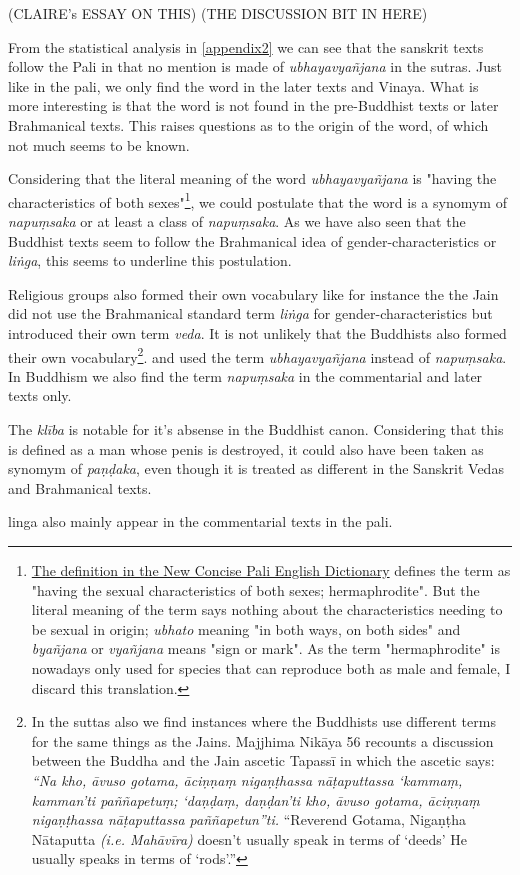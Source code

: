 (CLAIRE's ESSAY ON THIS)
(THE DISCUSSION BIT IN HERE)


From the statistical analysis in \ref{appendix2} we can see that the sanskrit texts follow the Pali in that no mention is made of {\em ubhayavyañjana} in the sutras. Just like in the pali, we only find the word in the later texts and Vinaya. What is more interesting is that the word is not found in the pre-Buddhist texts or later Brahmanical texts. This raises questions as to the origin of the word, of which not much seems to be known.

Considering that the literal meaning of the word {\em ubhayavyañjana} is "having the characteristics of both sexes"\footnote{\href{https://suttacentral.net/define/ubhatovya%C3%B1janaka}{The definition in the New Concise Pali English Dictionary} defines the term as "having the sexual characteristics of both sexes; hermaphrodite". But the literal meaning of the term says nothing about the characteristics needing to be sexual in origin; {\em ubhato} meaning "in both ways, on both sides" and {\em byañjana} or {\em vyañjana} means "sign or mark". As the term "hermaphrodite" is nowadays only used for species that can reproduce both as male and female, I discard this translation.}, we could postulate that the word is a synomym of {\em napuṃsaka} or at least a class of {\em napuṃsaka}. As we have also seen that the Buddhist texts seem to follow the Brahmanical idea of gender-characteristics or {\em liṅga}, this seems to underline this postulation.

Religious groups also formed their own vocabulary like for instance the the Jain did not use the Brahmanical standard term {\em liṅga} for gender-characteristics but introduced their own term {\em veda}. It is not unlikely that the Buddhists also formed their own vocabulary\footnote{In the suttas also we find instances where the Buddhists use different terms for the same things as the Jains. Majjhima Nikāya 56 recounts a discussion between the Buddha and the Jain ascetic Tapassī in which the ascetic says: {\em “Na kho, āvuso gotama, āciṇṇaṃ nigaṇṭhassa nāṭaputtassa ‘kammaṃ, kamman’ti paññapetuṃ; ‘daṇḍaṃ, daṇḍan’ti kho, āvuso gotama, āciṇṇaṃ nigaṇṭhassa nāṭaputtassa paññapetun”ti.} “Reverend Gotama, Nigaṇṭha Nātaputta {\em (i.e. Mahāvīra)} doesn’t usually speak in terms of ‘deeds’ He usually speaks in terms of ‘rods’.” }. and used the term {\em ubhayavyañjana} instead of {\em napuṃsaka}. In Buddhism we also find the term {\em napuṃsaka} in the commentarial and later texts only.


The {\em klība} is notable for it's absense in the Buddhist canon. Considering that this is defined as a man whose penis is destroyed, it could also have been taken as synomym of {\em paṇḍaka}, even though it is treated as different in the Sanskrit Vedas and Brahmanical texts.

linga also mainly appear in the commentarial texts in the pali.